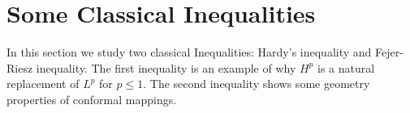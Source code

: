 % 
\section{Some Classical Inequalities}
In this section we study two classical Inequalities: Hardy's inequality and Fejer-Riesz inequality. The first inequality is an
example of why $H^p$ is a natural replacement of $L^p$ for $p\leq 1$. The second inequality shows some geometry properties of conformal mappings.
